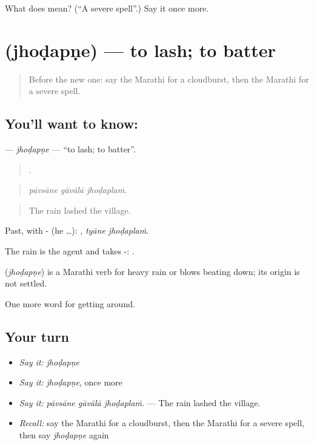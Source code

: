 \begin{tcolorbox}[breakable,colback=teal!4,colframe=teal!35!black,title={Before you move on}]
What does  mean? (\textquotedblleft{}A severe spell\textquotedblright{}.) Say it once more.
\end{tcolorbox}
\section[\texorpdfstring{\mr{झोडपणे} (jhoḍapṇe)}{झोडपणे (jhoḍapṇe)}]{ (jhoḍapṇe) — to lash; to batter}

\label{lesson:MR-C440-jhodapne}



\begin{quote}
Before the new one: say the Marathi for a cloudburst, then the Marathi for a severe spell.
\end{quote}

\subsection*{You'll want to know: }
\textbf{} — \emph{jhoḍapṇe} — \textquotedblleft{}to lash; to batter\textquotedblright{}.

\begin{quote}
  .
\end{quote}

\begin{quote}
\emph{pāvsāne gāvālā jhoḍaplaṁ.}
\end{quote}

\begin{quote}
The rain lashed the village.
\end{quote}

Past, with - (he …):  , \emph{tyāne jhoḍaplaṁ}.

The rain is the agent and takes -:  .

\begin{cousinweb}
\textbf{} (\emph{jhoḍapṇe}) is a Marathi verb for heavy rain or blows beating down; its origin is not settled.
\end{cousinweb}

\begin{grammarlens}[title={What you've built}]
One more word for getting around.
\end{grammarlens}

\subsection*{Your turn}
\begin{itemize}
\raggedright
  \item \emph{Say it:} \emph{jhoḍapṇe}
  \item \emph{Say it:} \emph{jhoḍapṇe}, once more
  \item \emph{Say it:} \emph{pāvsāne gāvālā jhoḍaplaṁ.} — The rain lashed the village.
  \item \emph{Recall:} say the Marathi for a cloudburst, then the Marathi for a severe spell, then say \emph{jhoḍapṇe} again
\end{itemize}

